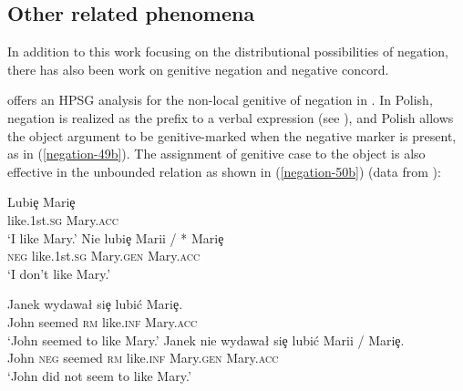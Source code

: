 \documentclass[output=paper
	        ,collection
	        ,collectionchapter
 	        ,biblatex
                ,babelshorthands
                ,newtxmath
                ,draftmode
                ,colorlinks, citecolor=brown
]{langscibook}
\begin{document}
{\begin{exe}
\begin{xlist}
\iffalse{
The VSO language Welsh also employs a preverbal
negative, as illustrated by \citet{BJ:00}:

\ea
\ex \label{negation-NC-1a}
\gll Ni chaf sefyll yma \\
     \textsc{neg} can stand here\\
\glt `I can't stand here.'
\z
%
As given in (\ref{negation-NC-1a}), Welsh allows the preverbal
particle \type{ni} to occur in the preverbal position.
%
With treating the negative particle to form a negative word
with the following stem, \citet{BJ:00} offer a selectional
analysis of negation.
That is, the finite negative verb selects
two complements (e.g., subject and object) while
the non-finite negative verb selects a VP.}\fi

\section{Other related phenomena}

In addition to this work focusing on the distributional possibilities
 of negation, there has also been work on genitive negation and negative concord.

 \citet{Prz:00} offers an HPSG analysis for the non-local genitive of negation in .
 In Polish, negation is realized as the prefix  to a verbal expression (see \citealt{PK:99, Prz:00, Prz:01}), and
 Polish allows the object argument to be genitive-marked when the negative marker is present, as in (\ref{negation-49b}).
  The assignment of genitive case to the object is also effective in
  the unbounded relation as shown in (\ref{negation-50b}) (data from \citealt[]{Prz:00}):

\eal
\ex  \label{negation-genitive}
\gll Lubi\c{e} Mari\c{e} \\
     like.1st.\textsc{sg} Mary.\textsc{acc}\\%
\glt `I like Mary.'
\ex \label{negation-49b}
\gll Nie lubi\c{e} Marii / * Mari\c{e} \\
     \textsc{neg} like.1st.\textsc{sg} Mary.\textsc{gen} {} {} Mary.\textsc{acc}\\
\glt `I don't like Mary.'
\zl

\eal
\ex \label{negation-genitive-1}
\gll  Janek wydawa\l{} si\c{e} lubi\'{c} Mari\c{e}.\\
      John seemed \textsc{rm}     like.\textsc{inf} Mary.\textsc{acc}\\%
\glt `John seemed to like Mary.'
\ex \label{negation-50b}
\gll  Janek nie wydawa\l{} si\c{e} lubi\'{c} Marii / Mari\c{e}.\\
      John \textsc{neg} seemed \textsc{rm} like.\textsc{inf}      Mary.\textsc{gen} {} Mary.\textsc{acc}\\
\glt `John did not seem to like Mary.'
\zl


\end{xlist}
\end{exe}}
\end{document}
